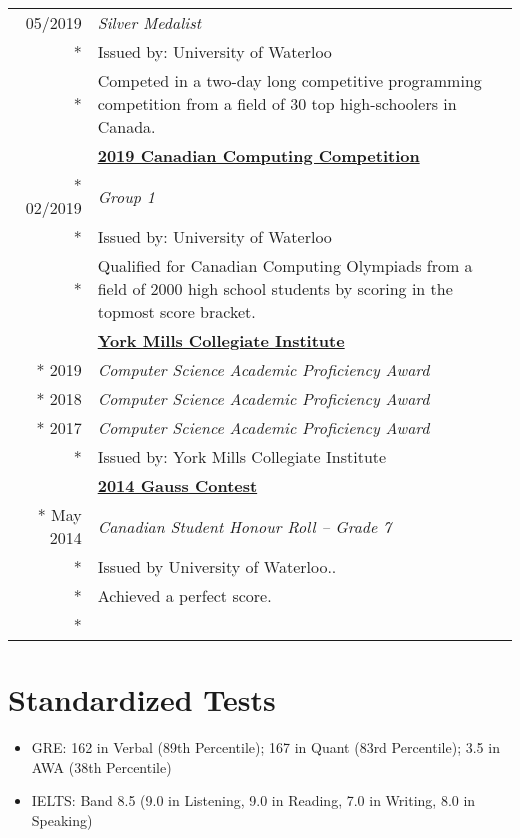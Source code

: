 \documentclass{article}
\begin{document}
\begin{tabularx}{\textwidth}{r X}
		05/2019 & \textit{Silver Medalist} \\*
		& {\small Issued by: University of Waterloo} \\*
		& {\small Competed in a two-day long competitive programming competition from a field of 30 top high-schoolers in Canada.} \\
		\iftoggle{verbose}{
			\addlinespace
			& \textbf{\href{https://www.cemc.uwaterloo.ca/contests/ccc-cco.html}{2019 Canadian Computing Competition}} \\*
			02/2019 & \textit{Group 1} \\*
			& {\small Issued by: University of Waterloo} \\*
			& {\small Qualified for Canadian Computing Olympiads from a field of 2000 high school students by scoring in the topmost score bracket.} \\
			\addlinespace
			& \textbf{\href{https://schoolweb.tdsb.on.ca/yorkmillsci/}{York Mills Collegiate Institute}} \\*
			2019 & \textit{Computer Science Academic Proficiency Award} \\*
			2018 & \textit{Computer Science Academic Proficiency Award} \\*
			2017 & \textit{Computer Science Academic Proficiency Award} \\*
			& {\small Issued by: York Mills Collegiate Institute} \\
			\addlinespace
			& \textbf{\href{https://www.cemc.uwaterloo.ca/contests/gauss.html}{2014 Gauss Contest}} \\*
			May 2014 & \textit{Canadian Student Honour Roll -- Grade 7} \\*
			& {\small Issued by University of Waterloo.}. \\*
			& {\small Achieved a perfect score.} \\*
		}{}
	\end{tabularx}

	\section*{Standardized Tests}

	\begin{itemize}[noitemsep]
		\item GRE: 162 in Verbal (89th Percentile); 167 in Quant (83rd Percentile); 3.5 in AWA (38th Percentile)
		\item IELTS: Band 8.5 (9.0 in Listening, 9.0 in Reading, 7.0 in Writing, 8.0 in Speaking)
	\end{itemize}
\end{document}
